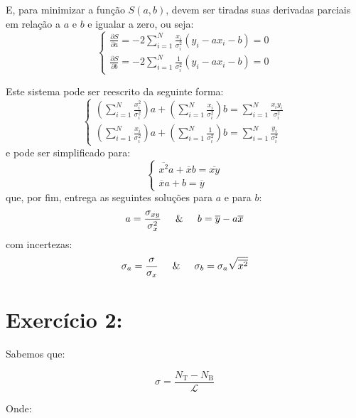\documentclass[14pt]{extarticle}
\begin{document}
E, para minimizar a função $S(a,b)$, devem ser tiradas suas derivadas parciais em relação a $a$ e $b$ e igualar a zero, ou seja:\large$$
\begin{cases}
    \frac{\partial S}{\partial a}=-2\sum_{i=1}^{N}\frac{x_{i}}{\sigma_{i}^{2}}\left(y_{i}-ax_{i}-b\right)=0 \\[0.3cm]
    \frac{\partial S}{\partial b}=-2\sum_{i=1}^{N}\frac{1}{\sigma_{i}^{2}}\left(y_{i}-ax_{i}-b\right)=0
\end{cases}$$\normalsize

Este sistema pode ser reescrito da seguinte forma:\large$$
\begin{cases}
    \left(\sum_{i=1}^{N}\frac{x_{i}^{2}}{\sigma_{i}^{2}}\right)a+\left(\sum_{i=1}^{N}\frac{x_{i}}{\sigma_{i}^{2}}\right)b=\sum_{i=1}^{N}\frac{x_{i}y_{i}}{\sigma_{i}^{2}}\\[0.5cm]
    \left(\sum_{i=1}^{N}\frac{x_{i}}{\sigma_{i}^{2}}\right)a+\left(\sum_{i=1}^{N}\frac{1}{\sigma_{i}^{2}}\right)b=\sum_{i=1}^{N}\frac{y_{i}}{\sigma_{i}^{2}}
\end{cases}$$\normalsize
e pode ser simplificado para:\large$$
\begin{cases}
    \overline{x^{2}}a+\overline{x}b=\overline{xy}\\
    \overline{x}a+b=\overline{y}
\end{cases}$$\normalsize
que, por fim, entrega as seguintes soluções para $a$ e para $b$:\large$$a=\frac{\sigma_{xy}}{\sigma_{x}^{2}}\hspace{0.5cm}\text{\&}\hspace{0.5cm}b=\overline{y}-a\overline{x}$$\normalsize com incertezas:\large$$\sigma_{a}=\frac{\sigma}{\sigma_{x}}\hspace{0.5cm}\text{\&}\hspace{0.5cm}\sigma_{b}=\sigma_{a}\sqrt{\overline{x^{2}}}$$
\newpage

\section*{\hspace{-1cm}Exercício 2:}

\hspace{0.5cm}
Sabemos que:

\large
$$\sigma=\frac{N_{\text{T}}-N_{\text{B}}}{\mathcal{L}}$$

\normalsize

Onde:

\hspace{0.5cm}
\end{document}
